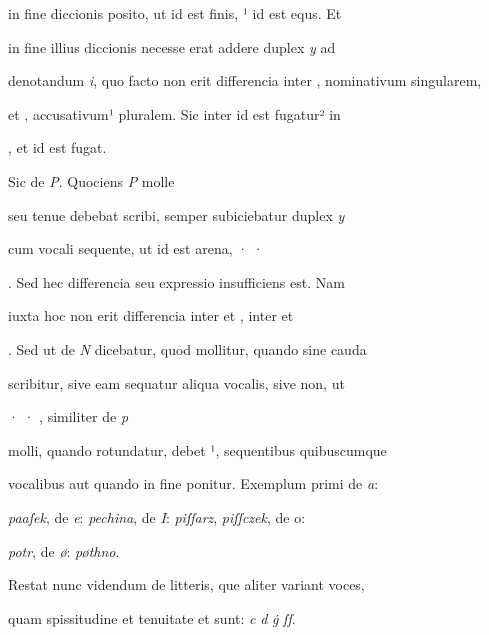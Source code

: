  in fine diccionis posito, ut  id est finis, ¹ id est equs. Et 

in fine illius diccionis  necesse erat addere duplex \textit{y} ad 

denotandum \textit{i}, quo facto non erit differencia inter , nominativum singularem, 

et , accusativum¹ pluralem. Sic inter  id est fugatur² in 

\splitlines
{}, et  id est fugat.

\indentK Sic de \textit{P}. Quociens \textit{P} molle 

\fulllines
seu tenue debebat scribi, semper subiciebatur duplex \textit{y} 

cum vocali sequente, ut  id est arena, · · 

. Sed hec differencia seu expressio insufficiens est. Nam 

iuxta hoc non erit differencia inter  et , inter  et 

. Sed ut de \textit{N} dicebatur, quod mollitur, quando sine cauda 

scribitur, sive eam sequatur aliqua vocalis, sive non, ut 

 · · , similiter de \textit{p} 

molli, quando rotundatur, debet ¹, sequentibus quibuscumque 

vocalibus aut quando in fine ponitur. Exemplum primi de \textit{a}: 

\textit{paaſek}, de \textit{e}: \textit{pechina}, de \textit{I}: \textit{piſſarz}, \textit{piſſczek}, de o\textit{}: 

\textit{potr}, de \textit{ø}: \textit{pøthno}. 

\indentP Restat nunc videndum de litteris, que aliter variant voces,

\splitlines
quam spissitudine et tenuitate et sunt: \textit{c} \textit{d} \textit{ġ} \textit{ſſ}.

